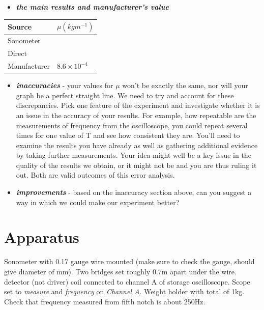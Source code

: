 \documentclass[
  letterpaper,
  DIV=11,
  numbers=noendperiod]{scrreprt}
\providecommand{\tightlist}{%
  \setlength{\itemsep}{0pt}\setlength{\parskip}{0pt}}\usepackage{longtable,booktabs,array}
\begin{document}
\begin{itemize}
\tightlist
\item
  \textbf{\emph{the main results and manufacturer's value}}
\end{itemize}

\begin{table}
\fontsize{12.0pt}{14.0pt}\selectfont
\begin{tabular*}{\linewidth}{@{\extracolsep{\fill}}ll}
\toprule
Source & \(\mu(kgm^{-1})\) \\ 
\midrule\addlinespace[2.5pt]
Sonometer &  \\ 
Direct &  \\ 
Manufacturer & \(8.6 \times 10^{-4}\) \\ 
\bottomrule
\end{tabular*}
\end{table}

\begin{itemize}
\item
  \textbf{\emph{inaccuracies}} - your values for \(\mu\) won't be
  exactly the same, nor will your graph be a perfect straight line. We
  need to try and account for these discrepancies. Pick one feature of
  the experiment and investigate whether it is an issue in the accuracy
  of your results. For example, how repeatable are the measurements of
  frequency from the oscilloscope, you could repeat several times for
  one value of T and see how consistent they are. You'll need to examine
  the results you have already as well as gathering additional evidence
  by taking further measurements. Your idea might well be a key issue in
  the quality of the results we obtain, or it might not be and you are
  thus ruling it out. Both are valid outcomes of this error analysis.
\item
  \textbf{\emph{improvements}} - based on the inaccuracy section above,
  can you suggest a way in which we could make our experiment better?
\end{itemize}

\section{Apparatus}\label{apparatus-7}

Sonometer with 0.17 gauge wire mounted (make sure to check the gauge,
should give diameter of mm). Two bridges set roughly 0.7m apart under
the wire. detector (not driver) coil connected to channel A of storage
oscilloscope. Scope set to \emph{measure} and \emph{frequency} on
\emph{Channel A}. Weight holder with total of 1kg. Check that frequency
measured from fifth notch is about 250Hz.
\end{document}

